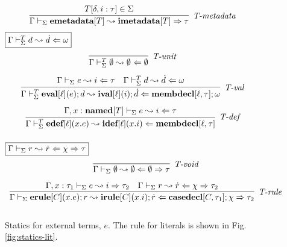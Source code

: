 \begin{figure}
\[\begin{array}{c}
\infer[\textit{T-metadata}]
        {\Gamma \vdash_\Sigma \keyw{emetadata}[T]  \leadsto \keyw{imetadata}[T]  \Rightarrow \tau}
	{T[\delta, i : \tau] \in \Sigma}
\end{array}
\]
$\fbox{$\Gamma \vdash_\Sigma^T d \leadsto \dot d \Leftarrow \omega$}$
\vspace{-15px}\[
\begin{array}{c}
\infer[\textit{T-unit}]{\Gamma \vdash_\Sigma^T \emptyset \leadsto \emptyset \Leftarrow \emptyset}{ }
\\[2ex]
\infer[\textit{T-val}]
	{\Gamma \vdash_\Sigma^T \keyw{eval}[\ell](e); d \leadsto \keyw{ival}[\ell](i); \dot{d} \Leftarrow \keyw{membdecl}[\ell, \tau]; \omega}
	{\Gamma \vdash_\Sigma e \leadsto i \Leftarrow \tau & \Gamma \vdash_\Sigma^T d \leadsto \dot{d} \Leftarrow \omega} \\[2ex]
	
\infer[\textit{T-def}]
	{\Gamma \vdash_\Sigma^T \keyw{edef}[\ell](x.e)  \leadsto \keyw{idef}[\ell](x.i) \Leftarrow \keyw{membdecl}[\ell, \tau]}
	{\Gamma, x : \keyw{named}[T] \vdash_\Sigma e \leadsto i \Leftarrow \tau}\\[2ex]
\end{array}
\]
$\fbox{$\Gamma \vdash_\Sigma r \leadsto \dot{r} \Leftarrow \chi \Rightarrow \tau$}$
\vspace{-15px}\[
\begin{array}{c}
\infer[\textit{T-void}]
	{\Gamma \vdash_\Sigma \emptyset \leadsto \emptyset \Leftarrow \emptyset \Rightarrow \tau}{ }\\[2ex]
\infer[\textit{T-rule}]
	{\Gamma \vdash_\Sigma  \keyw{erule}[C](x.e); r \leadsto \keyw{irule}[C](x.i); \dot{r} \Leftarrow \keyw{casedecl}[C, \tau_1]; \chi \Rightarrow \tau_2} 
	{\Gamma, x:\tau_1 \vdash_\Sigma e \leadsto i \Rightarrow \tau_2
	 & \Gamma\vdash_\Sigma r \leadsto \dot{r} \Leftarrow \chi \Rightarrow \tau_2}\\[2ex]
%
\end{array}
\]
\vspace{-10px}
\caption{Statics for external terms, $e$. The rule for literals is shown in Fig. \ref{fig:statics-lit}.}
\label{fig:statics1}
\end{figure}
